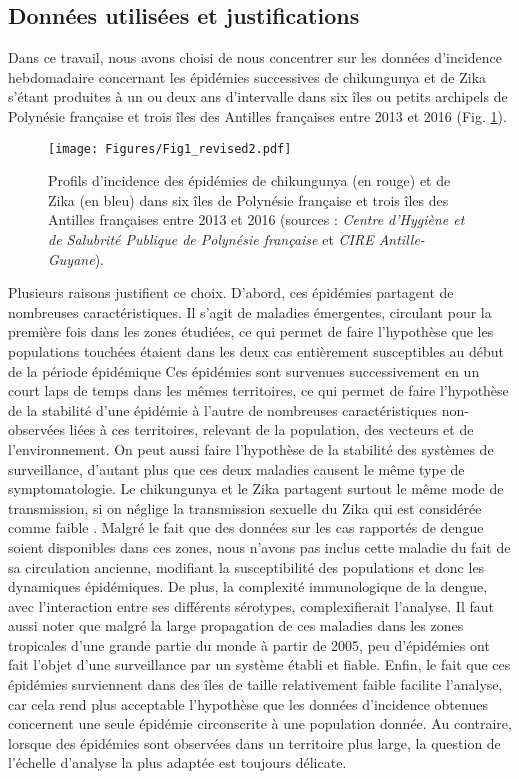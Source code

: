 \subsection{Données utilisées et justifications}

Dans ce travail, nous avons choisi de nous concentrer sur les données d'incidence hebdomadaire concernant les épidémies successives de chikungunya et de Zika s'étant produites à un ou deux ans d'intervalle dans six îles ou petits archipels de Polynésie française et trois îles des Antilles françaises entre 2013 et 2016 (Fig. \ref{fig:profiles}).
\begin{figure}[t]
	\centering
	\texttt{[image: Figures/Fig1\_revised2.pdf]}
	\caption{Profils d'incidence des épidémies de chikungunya (en rouge) et de Zika (en bleu) dans six îles de Polynésie française et trois îles des Antilles françaises entre 2013 et 2016 (sources : {\em Centre d'Hygiène et de Salubrité Publique de Polynésie française} et {\em CIRE Antille-Guyane}).}
	\label{fig:profiles}
\end{figure}
Plusieurs raisons justifient ce choix.
D'abord, ces épidémies partagent de nombreuses caractéristiques.
Il s'agit de maladies émergentes, circulant pour la première fois dans les zones étudiées, ce qui permet de faire l'hypothèse que les populations touchées étaient dans les deux cas entièrement susceptibles au début de la période épidémique
Ces épidémies sont survenues successivement en un court laps de temps dans les mêmes territoires, ce qui permet de faire l'hypothèse de la stabilité d'une épidémie à l'autre de nombreuses caractéristiques non-observées liées à ces territoires, relevant de la population, des vecteurs et de l'environnement.
On peut aussi faire l'hypothèse de la stabilité des systèmes de surveillance, d'autant plus que ces deux maladies causent le même type de symptomatologie.
Le chikungunya et le Zika partagent surtout le même mode de transmission, si on néglige la transmission sexuelle du Zika qui est considérée comme faible \cite{althaus_how_2016}.
Malgré le fait que des données sur les cas rapportés de dengue soient disponibles dans ces zones, nous n'avons pas inclus cette maladie du fait de sa circulation ancienne, modifiant la susceptibilité des populations et donc les dynamiques épidémiques.
De plus, la complexité immunologique de la dengue, avec l'interaction entre ses différents sérotypes, complexifierait l'analyse.
Il faut aussi noter que malgré la large propagation de ces maladies dans les zones tropicales d'une grande partie du monde à partir de 2005, peu d'épidémies ont fait l'objet d'une surveillance par un système établi et fiable.
Enfin, le fait que ces épidémies surviennent dans des îles de taille relativement faible facilite l'analyse, car cela rend plus acceptable l'hypothèse que les données d'incidence obtenues concernent une seule épidémie circonscrite à une population donnée.
Au contraire, lorsque des épidémies sont observées dans un territoire plus large, la question de l'échelle d'analyse la plus adaptée est toujours délicate.

